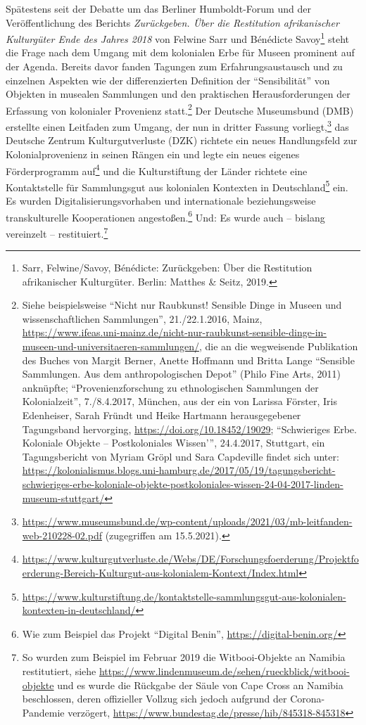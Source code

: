 \documentclass[a4paper,
fontsize=11pt,
oneside,
numbers=noperiodatend,
parskip=half-,
bibliography=totoc,
final
]{scrartcl}
\begin{document}
Spätestens seit der Debatte um das Berliner Humboldt-Forum und der
Veröffentlichung des Berichts \emph{Zurückgeben. Über die Restitution
afrikanischer Kulturgüter Ende des Jahres 2018} von Felwine Sarr und
Bénédicte Savoy\footnote{Sarr, Felwine/Savoy, Bénédicte: Zurückgeben:
  Über die Restitution afrikanischer Kulturgüter. Berlin: Matthes \&
  Seitz, 2019.} steht die Frage nach dem Umgang mit dem kolonialen Erbe
für Museen prominent auf der Agenda. Bereits davor fanden Tagungen zum
Erfahrungsaustausch und zu einzelnen Aspekten wie der differenzierten
Definition der \enquote{Sensibilität} von Objekten in musealen
Sammlungen und den praktischen Herausforderungen der Erfassung von
kolonialer Provenienz statt.\footnote{Siehe beispielsweise
  \enquote{Nicht nur Raubkunst! Sensible Dinge in Museen und
  wissenschaftlichen Sammlungen}, 21./22.1.2016, Mainz,
  \url{https://www.ifeas.uni-mainz.de/nicht-nur-raubkunst-sensible-dinge-in-museen-und-universitaeren-sammlungen/},
  die an die wegweisende Publikation des Buches von Margit Berner,
  Anette Hoffmann und Britta Lange \enquote{Sensible Sammlungen. Aus dem
  anthropologischen Depot} (Philo Fine Arts, 2011) anknüpfte;
  \enquote{Provenienzforschung zu ethnologischen Sammlungen der
  Kolonialzeit}, 7./8.4.2017, München, aus der ein von Larissa Förster,
  Iris Edenheiser, Sarah Fründt und Heike Hartmann herausgegebener
  Tagungsband hervorging,
  \url{https://doi.org/10.18452/19029};
  \enquote{Schwieriges Erbe. Koloniale Objekte -- Postkoloniales Wissen'}, 24.4.2017,
  Stuttgart, ein Tagungsbericht von Myriam Gröpl und Sara Capdeville
  findet sich unter: 
  \url{https://kolonialismus.blogs.uni-hamburg.de/2017/05/19/tagungsbericht-schwieriges-erbe-koloniale-objekte-postkoloniales-wissen-24-04-2017-linden-museum-stuttgart/}}
Der Deutsche Museumsbund (DMB) erstellte einen Leitfaden zum Umgang, der
nun in dritter Fassung vorliegt,\footnote{\url{https://www.museumsbund.de/wp-content/uploads/2021/03/mb-leitfanden-web-210228-02.pdf}
  (zugegriffen am 15.5.2021).} das Deutsche Zentrum Kulturgutverluste
(DZK) richtete ein neues Handlungsfeld zur Kolonialprovenienz in seinen
Rängen ein und legte ein neues eigenes Förderprogramm auf\footnote{\url{https://www.kulturgutverluste.de/Webs/DE/Forschungsfoerderung/Projektfoerderung-Bereich-Kulturgut-aus-kolonialem-Kontext/Index.html}}
und die Kulturstiftung der Länder richtete eine Kontaktstelle für
Sammlungsgut aus kolonialen Kontexten in Deutschland\footnote{\url{https://www.kulturstiftung.de/kontaktstelle-sammlungsgut-aus-kolonialen-kontexten-in-deutschland/}}
ein. Es wurden Digitalisierungsvorhaben und internationale
beziehungsweise transkulturelle Kooperationen angestoßen.\footnote{Wie
  zum Beispiel das Projekt \enquote{Digital Benin},
  \url{https://digital-benin.org/}} Und: Es wurde auch -- bislang
vereinzelt -- restituiert.\footnote{So wurden zum Beispiel im Februar
  2019 die Witbooi-Objekte an Namibia restitutiert, siehe
  \url{https://www.lindenmuseum.de/sehen/rueckblick/witbooi-objekte} und
  es wurde die Rückgabe der Säule von Cape Cross an Namibia beschlossen,
  deren offizieller Vollzug sich jedoch aufgrund der Corona-Pandemie
  verzögert, \url{https://www.bundestag.de/presse/hib/845318-845318}}
\end{document}
